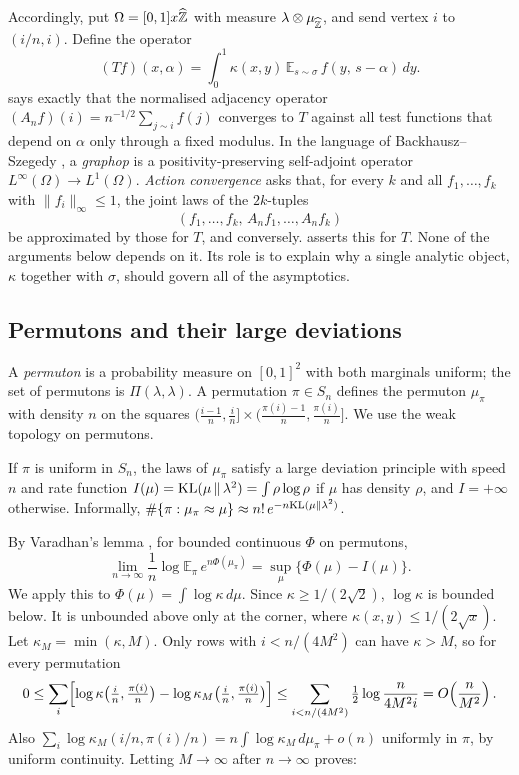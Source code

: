 Accordingly, put $\Omega=[0,1]x\widehat{\mathbb{Z}}$ with measure $\lambda\otimes\mu_{\widehat{\mathbb{Z}}}$, and send
vertex $i$ to $(i/n,i)$. Define the operator
\[
(Tf)(x,\alpha)=\int_0^1\kappa(x,y)\,\mathbb{E}_{s\sim\sigma}\,f(y,\,s-\alpha)\,dy .
\]
 says exactly that the normalised adjacency operator
$(A_nf)(i)=n^{-1/2}\sum_{j\sim i}f(j)$ converges to $T$ against all test functions that
depend on $\alpha$ only through a fixed modulus. In the language of Backhausz--Szegedy
\cite{BackhauszSzegedy}, a \emph{graphop} is a positivity-preserving self-adjoint
operator $L^\infty(\Omega)\to L^1(\Omega)$. \emph{Action convergence} asks that, for
every $k$ and all $f_1,\dots,f_k$ with $\|f_i\|_\infty\le1$, the joint laws of
the $2k$-tuples
\[(f_1,\dots,f_k,\,A_nf_1,\dots,A_nf_k)\]
be approximated by those for $T$, and conversely.
 asserts this for $T$. None of the arguments below depends on it. Its
role is to explain why a single analytic object, $\kappa$ together with $\sigma$,
should govern all of the asymptotics.

\subsection{Permutons and their large deviations}
A \emph{permuton} is a probability measure on $[0,1]^2$ with both marginals uniform; the
set of permutons is $\Pi(\lambda,\lambda)$. A permutation $\pi\in S_n$ defines the
permuton $\mu_\pi$ with density $n$ on the squares
$\bigl(\frac{i-1}n,\frac in\bigr]\times\bigl(\frac{\pi(i)-1}n,\frac{\pi(i)}n\bigr]$. We use the weak
topology on permutons.

\begin{theorem}\label{thm:LDPperm}
If $\pi$ is uniform in $S_n$, the laws of $\mu_\pi$ satisfy a large deviation principle
with speed $n$ and rate function $I(\mu)=\mathrm{KL}(\mu\,\|\,\lambda^2)=\int\rho\log\rho$ if $\mu$
has density $\rho$, and $I=+\infty$ otherwise. Informally,
$\#\{\pi:\mu_\pi\approx\mu\}\approx n!\,e^{-n\mathrm{KL}(\mu\|\lambda^2)}$.
\end{theorem}

By Varadhan's lemma \cite[Thm.~4.3.1]{DemboZeitouni}, for bounded continuous $\Phi$ on
permutons,
\[
\lim_{n\to\infty}\frac1n\log\mathbb{E}_\pi\,e^{n\Phi(\mu_\pi)}=\sup_\mu\{\Phi(\mu)-I(\mu)\}.
\]
We apply this to $\Phi(\mu)=\int\log\kappa\,d\mu$. Since $\kappa\ge 1/(2\sqrt2)$,
$\log\kappa$ is bounded below. It is unbounded above only at the corner, where
$\kappa(x,y)\le 1/(2\sqrt x)$. Let $\kappa_M=\min(\kappa,M)$. Only rows with
$i<n/(4M^2)$ can have $\kappa>M$, so for every permutation
\[
0\le\sum_i\Bigl[\log\kappa\bigl(\tfrac in,\tfrac{\pi(i)}n\bigr)-\log\kappa_M\bigl(\tfrac in,\tfrac{\pi(i)}n\bigr)\Bigr]
\le\sum_{i<n/(4M^2)}\tfrac12\log\frac{n}{4M^2i}=O\!\left(\frac n{M^2}\right).
\]
Also $\sum_i\log\kappa_M(i/n,\pi(i)/n)=n\int\log\kappa_M\,d\mu_\pi+o(n)$ uniformly in $\pi$,
by uniform continuity. Letting $M\to\infty$ after $n\to\infty$ proves:

